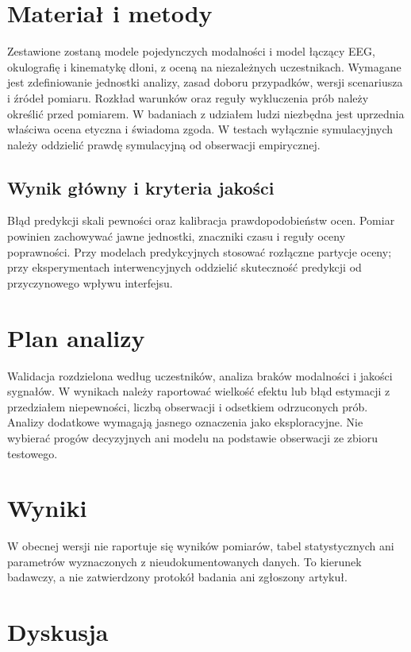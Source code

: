 \documentclass[11pt,a4paper]{article}
\begin{document}
\section{Materiał i metody}

Zestawione zostaną modele pojedynczych modalności i model łączący EEG, okulografię i kinematykę dłoni, z oceną na niezależnych uczestnikach. Wymagane jest zdefiniowanie jednostki analizy, zasad doboru przypadków, wersji scenariusza i źródeł pomiaru. Rozkład warunków oraz reguły wykluczenia prób należy określić przed pomiarem. W badaniach z udziałem ludzi niezbędna jest uprzednia właściwa ocena etyczna i świadoma zgoda. W testach wyłącznie symulacyjnych należy oddzielić prawdę symulacyjną od obserwacji empirycznej.

\subsection{Wynik główny i kryteria jakości}

Błąd predykcji skali pewności oraz kalibracja prawdopodobieństw ocen. Pomiar powinien zachowywać jawne jednostki, znaczniki czasu i reguły oceny poprawności. Przy modelach predykcyjnych stosować rozłączne partycje oceny; przy eksperymentach interwencyjnych oddzielić skuteczność predykcji od przyczynowego wpływu interfejsu.

\section{Plan analizy}

Walidacja rozdzielona według uczestników, analiza braków modalności i jakości sygnałów. W wynikach należy raportować wielkość efektu lub błąd estymacji z przedziałem niepewności, liczbą obserwacji i odsetkiem odrzuconych prób. Analizy dodatkowe wymagają jasnego oznaczenia jako eksploracyjne. Nie wybierać progów decyzyjnych ani modelu na podstawie obserwacji ze zbioru testowego.

\section{Wyniki}

W obecnej wersji nie raportuje się wyników pomiarów, tabel statystycznych ani parametrów wyznaczonych z nieudokumentowanych danych. To kierunek badawczy, a nie zatwierdzony protokół badania ani zgłoszony artykuł.

\section{Dyskusja}
\end{document}
